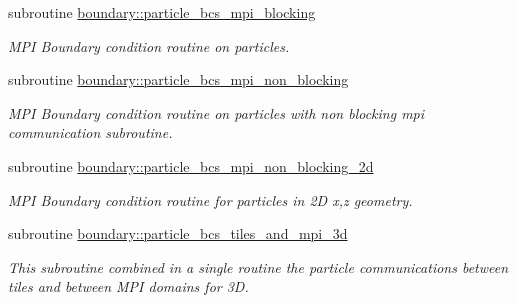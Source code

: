 \begin{DoxyCompactItemize}
subroutine \hyperlink{namespaceboundary_a1789d63402ac897697791a2fca4fa8e6}{boundary\+::particle\+\_\+bcs\+\_\+mpi\+\_\+blocking}
\begin{DoxyCompactList}\small\item\em M\+PI Boundary condition routine on particles. \end{DoxyCompactList}\item 
subroutine \hyperlink{namespaceboundary_aac32f7f65f1998963706f9d5776d29d2}{boundary\+::particle\+\_\+bcs\+\_\+mpi\+\_\+non\+\_\+blocking}
\begin{DoxyCompactList}\small\item\em M\+PI Boundary condition routine on particles with non blocking mpi communication subroutine. \end{DoxyCompactList}\item 
subroutine \hyperlink{namespaceboundary_a3293856926030dfea9e8ca05c61e1a5a}{boundary\+::particle\+\_\+bcs\+\_\+mpi\+\_\+non\+\_\+blocking\+\_\+2d}
\begin{DoxyCompactList}\small\item\em M\+PI Boundary condition routine for particles in 2D x,z geometry. \end{DoxyCompactList}\item 
subroutine \hyperlink{namespaceboundary_ac117306978e83b787afba90c3ac038f4}{boundary\+::particle\+\_\+bcs\+\_\+tiles\+\_\+and\+\_\+mpi\+\_\+3d}
\begin{DoxyCompactList}\small\item\em This subroutine combined in a single routine the particle communications between tiles and between M\+PI domains for 3D. \end{DoxyCompactList}\end{DoxyCompactItemize}
